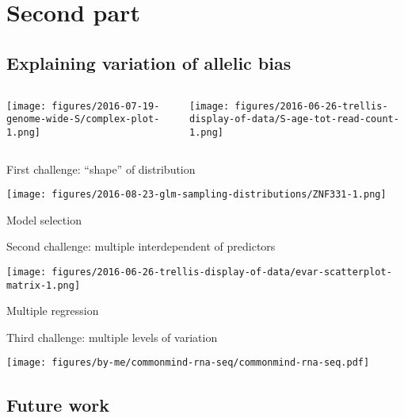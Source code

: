 \documentclass{beamer}
\begin{document}
\section{Second part}

\subsection{Explaining variation of allelic bias}

\begin{frame}
\begin{columns}[t]
\begin{column}{0.4\textwidth}

\texttt{[image: figures/2016-07-19-genome-wide-S/complex-plot-1.png]}
\end{column}

\begin{column}{0.6\textwidth}

\texttt{[image: figures/2016-06-26-trellis-display-of-data/S-age-tot-read-count-1.png]}
\end{column}
\end{columns}
\end{frame}

\begin{frame}{First challenge: ``shape'' of distribution}
\begin{center}
\texttt{[image: figures/2016-08-23-glm-sampling-distributions/ZNF331-1.png]}
\end{center}
\end{frame}

\begin{frame}{Model selection}

\end{frame}

\begin{frame}{Second challenge: multiple interdependent of predictors}
\begin{center}
\texttt{[image: figures/2016-06-26-trellis-display-of-data/evar-scatterplot-matrix-1.png]}
\end{center}
\end{frame}

\begin{frame}{Multiple regression}

\end{frame}

\begin{frame}{Third challenge: multiple levels of variation}
\begin{center}
\texttt{[image: figures/by-me/commonmind-rna-seq/commonmind-rna-seq.pdf]}
\end{center}
\end{frame}

\subsection{Future work}
\end{document}
